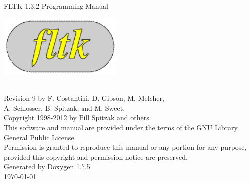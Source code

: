 \documentclass[a4paper]{book}
\begin{document}
\begin{titlepage}
\vspace*{4.5cm}
\begin{center}
{\Huge FLTK 1.3.2 Programming Manual}\\
\vspace*{2cm}
\begin{ImageNoCaption}
 \mbox{\includegraphics[width=6cm]{FL200}}
\end{ImageNoCaption}\\
\vspace*{2cm}
{\Large
Revision 9 by F. Costantini, D. Gibson, M. Melcher, \\
A. Schlosser, B. Spitzak, and M. Sweet.}\\
\vspace*{1.5cm}
{\large Copyright 1998-2012 by Bill Spitzak and others.}\\
\vspace*{0.75cm}
{\Small
This software and manual are provided under the terms of the GNU Library General Public License.}\\
{\Small
Permission is granted to reproduce this manual or any portion for any purpose,}\\
{\Small
provided this copyright and permission notice are preserved.}\\
\vspace*{2.5cm}
{\large Generated by Doxygen 1.7.5}\\
\vspace*{0.5cm}
\today{}\\
\end{center}
\end{titlepage}
\clearemptydoublepage
{}
\tableofcontents
\clearemptydoublepage
{}
\end{document}
